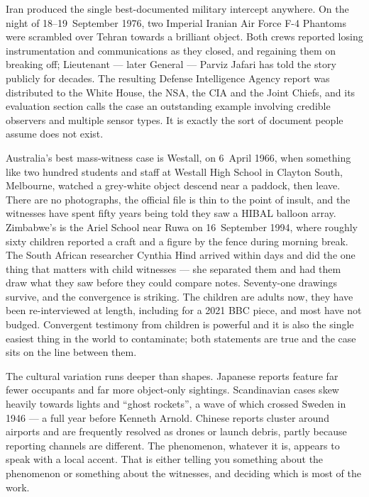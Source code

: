 Iran produced the single best-documented military intercept anywhere. On the night of
18--19~September 1976, two Imperial Iranian Air Force F-4 Phantoms were scrambled over
Tehran towards a brilliant object. Both crews reported losing instrumentation and
communications as they closed, and regaining them on breaking off; Lieutenant --- later
General --- Parviz Jafari has told the story publicly for decades. The resulting Defense
Intelligence Agency report was distributed to the White House, the NSA, the CIA and the
Joint Chiefs, and its evaluation section calls the case an outstanding example involving
credible observers and multiple sensor types. It is exactly the sort of document people
assume does not exist.

Australia's best mass-witness case is Westall, on 6~April 1966, when something like two
hundred students and staff at Westall High School in Clayton South, Melbourne, watched a
grey-white object descend near a paddock, then leave. There are no photographs, the official
file is thin to the point of insult, and the witnesses have spent fifty years being told they
saw a HIBAL balloon array. Zimbabwe's is the Ariel School near Ruwa on 16~September 1994,
where roughly sixty children reported a craft and a figure by the fence during morning break.
The South African researcher Cynthia Hind arrived within days and did the one thing that
matters with child witnesses --- she separated them and had them draw what they saw before
they could compare notes. Seventy-one drawings survive, and the convergence is striking.
The children are adults now, they have been re-interviewed at length, including for a 2021
BBC piece, and most have not budged. Convergent testimony from children is powerful and it
is also the single easiest thing in the world to contaminate; both statements are true and
the case sits on the line between them.

\begin{funfact}
The cultural variation runs deeper than shapes. Japanese reports feature far fewer
occupants and far more object-only sightings. Scandinavian cases skew heavily towards
lights and ``ghost rockets'', a wave of which crossed Sweden in 1946 --- a full year
before Kenneth Arnold. Chinese reports cluster around airports and are frequently
resolved as drones or launch debris, partly because reporting channels are different.
The phenomenon, whatever it is, appears to speak with a local accent. That is either
telling you something about the phenomenon or something about the witnesses, and
deciding which is most of the work.
\end{funfact}

